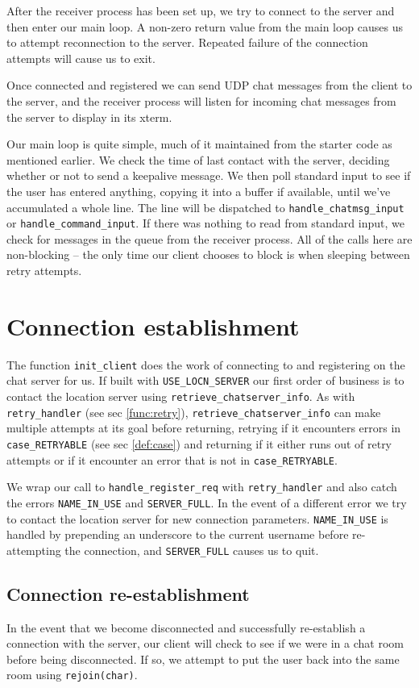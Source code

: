 \documentclass[12pt]{article}
\newcommand{\mono}[1]{\texttt{#1}}
\begin{document}
After the receiver process has been set up, we try to connect to the
server and then enter our main loop. A non-zero return value from the
main loop causes us to attempt reconnection to the server. Repeated 
failure of the connection attempts will cause us to exit.

Once connected and registered we can send UDP chat messages from the
client to the server, and the receiver process will listen for incoming
chat messages from the server to display in its xterm.

Our main loop is quite simple, much of it maintained from the starter code
as mentioned earlier. We check the time of last contact with the server,
deciding whether or not to send a keepalive message. We then
poll standard input to see if the user has entered anything, copying it into
a buffer if available, until we've accumulated a whole line. The line will be
dispatched to \mono{handle\_chatmsg\_input} or
\mono{handle\_command\_input}. If there 
was nothing to read from standard input, we check for messages in the
queue from the receiver process. All of the calls here are non-blocking --
the only time our client chooses to block is when sleeping between retry
attempts.

\section{Connection establishment}
\label{sec:init}
The function \mono{init\_client} does the work of connecting to and registering
on the chat server for us.
If built with \mono{USE\_LOCN\_SERVER} our first order of business is to contact
the location server using \mono{retrieve\_chatserver\_info}. As with 
\mono{retry\_handler} (see sec \ref{func:retry}), \mono{retrieve\_chatserver\_info} can
make multiple attempts
at its goal before returning, retrying if it encounters errors in
\mono{case\_RETRYABLE} (see sec \ref{def:case}) and returning if it either runs
out of retry attempts or if it encounter an error that is not in
\mono{case\_RETRYABLE}.

We wrap our call to \mono{handle\_register\_req} with \mono{retry\_handler} and
also catch the errors \mono{NAME\_IN\_USE} and \mono{SERVER\_FULL}. In the event
of a different
error we try to contact the location server for new connection parameters.
\mono{NAME\_IN\_USE} is handled by prepending an underscore to the current username
before re-attempting the connection, and \mono{SERVER\_FULL} causes us to quit.

\subsection{Connection re-establishment}
In the event that we become disconnected and successfully re-establish a
connection with the server, our client will check to see if we were in a chat
room before being disconnected. If so, we attempt to put the user back into the
same room using \mono{rejoin(char)}.
\end{document}
